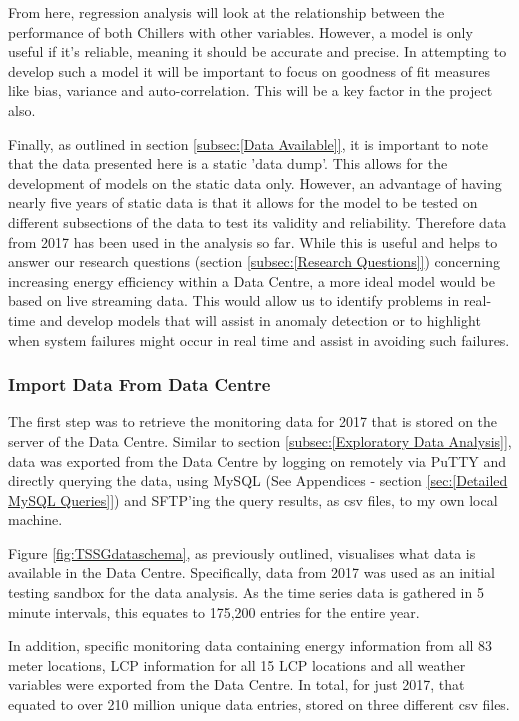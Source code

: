 \documentclass[12pt]{scrartcl}
\begin{document}
From here, regression analysis will look at the relationship between the performance of both Chillers with other variables. However, a model is only useful if it's reliable, meaning it should be accurate and precise. In attempting to develop such a model it will be important to focus on goodness of fit measures like bias, variance and auto-correlation. This will be a key factor in the project also.

Finally, as outlined in section \ref{subsec:[Data Available]}, it is important to note that the data presented here is a static 'data dump'. This allows for the development of models on the static data only. However, an advantage of having nearly five years of static data is that it allows for the model to be tested on different subsections of the data to test its validity and reliability.  Therefore data from 2017 has been used in the analysis so far. While this is useful and helps to answer our research questions (section \ref{subsec:[Research Questions]}) concerning increasing energy efficiency within a Data Centre, a more ideal model would be based on live streaming data. This would allow us to identify problems in real-time and develop models that will assist in anomaly detection or to highlight when system failures might occur in real time and assist in avoiding such failures. 

\subsubsection{Import Data From Data Centre}
\label{subsubsec:[Import Data From Data Centre]}

The first step was to retrieve the monitoring data for 2017 that is stored on the server of the Data Centre. Similar to section \ref{subsec:[Exploratory Data Analysis]}, data was exported from the Data Centre by logging on remotely via PuTTY and directly querying the data, using MySQL (See Appendices - section \ref{sec:[Detailed MySQL Queries]}) and SFTP'ing the query results, as csv files, to my own local machine. 

Figure \ref{fig:TSSGdataschema}, as previously outlined, visualises what data is available in the Data Centre. Specifically, data from 2017 was used as an initial testing sandbox for the data analysis. As the time series data is gathered in 5 minute intervals, this equates to 175,200 entries for the entire year. 

In addition, specific monitoring data containing energy information from all 83 meter locations, \gls{LCP} information for all 15 \gls{LCP} locations and all weather variables were exported from the Data Centre. In total, for just 2017, that equated to over 210 million unique data entries, stored on three different csv files. 
\end{document}
